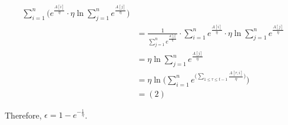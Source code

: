 \documentclass[11pt]{article}
\newenvironment{qparts}{\begin{enumerate}[{(}a{)}]}{\end{enumerate}}
\begin{document}
\begin{qparts}
\begin{align*}
		\sum_{i=1}^n \Bigg( 
		e^{ \frac{A[i]}{\eta}}
		\cdot 
		\eta \ln 
		{\sum_{j=1}^{n} e^{ \frac{A[j]}{\eta}}} 
		\Bigg) \\
		&=
		\frac{1}{\sum_{j=1}^{n} e^{ \frac{A[j]}{\eta}}}
		\cdot 
		\sum_{i=1}^n
		e^{ \frac{A[i]}{\eta}}
		\cdot 
		\eta \ln 
		{\sum_{j=1}^{n} e^{ \frac{A[j]}{\eta}}} \\
		&=
		\eta \ln 
		{\sum_{j=1}^{n} e^{ \frac{A[j]}{\eta}}} \\
		&=
		\eta \ln 
		\Bigg( 
		\sum_{i=1}^{n} 
		e^{
		\bigg ( 
		\sum_{1\le \tau \le t-1} \frac{A[\tau,i]}{\eta} 
		\bigg)} 
		\Bigg) \\
		&=
		(2)
	\end{align*}
	
	Therefore, $\epsilon = 1 - e^{-\frac{1}{\eta}}$.

	
\end{qparts}


\newpage
\end{document}
